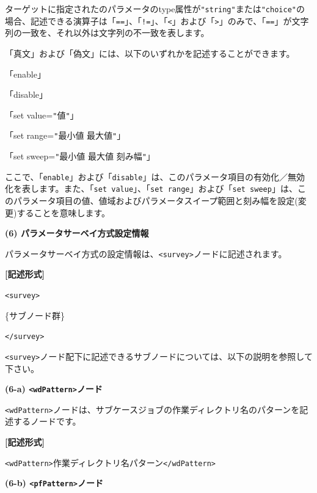 \documentclass[a4paper,11pt]{jarticle}
\begin{document}
{ターゲットに指定されたのパラメータのtype属性が\texttt{"string"}または\texttt{"choice"}の場合、記述できる演算子は「\texttt{==}」、「\texttt{!=}」、「\texttt{<}」および「\texttt{>}」のみで、「\texttt{==}」が文字列の一致を、それ以外は文字列の不一致を表します。

「真文」および「偽文」には、以下のいずれかを記述することができます。

\leftskip=10pt
\begin{tt}
「enable」

「disable」

「set value=\texttt{"}値\texttt{"}」

「set range=\texttt{"}最小値  最大値\texttt{"}」

「set sweep=\texttt{"}最小値  最大値  刻み幅\texttt{"}」
\end{tt}
\leftskip=0pt
ここで、「{\tt enable}」および「{\tt disable}」は、このパラメータ項目の有効化／無効化を表します。また、「{\tt set value}」、「{\tt set range}」および「{\tt set sweep}」は、このパラメータ項目の値、値域およびパラメータスイープ範囲と刻み幅を設定(変更)することを意味します。

\vspace{12pt}
\textbf{(6) パラメータサーベイ方式設定情報}

パラメータサーベイ方式の設定情報は、\texttt{<survey>}ノードに記述されます。

\vspace{8pt}
\leftskip=12pt
\textbf{[記述形式]}

\leftskip=42pt
\texttt{<survey>}    

\parindent=14pt
\{サブノード群\}

\parindent=0pt
\texttt{</survey>}

\vspace{8pt}
\leftskip=0pt
\texttt{<survey>}ノード配下に記述できるサブノードについては、以下の説明を参照して下さい。

\vspace{12pt}
\textbf{(6-a) \texttt{<wdPattern>}ノード}

\texttt{<wdPattern>}ノードは、サブケースジョブの作業ディレクトリ名のパターンを記述するノードです。

\vspace{8pt}
\leftskip=12pt
\textbf{[記述形式]}

\leftskip=42pt
\texttt{<wdPattern>}作業ディレクトリ名パターン\texttt{</wdPattern>}

\vspace{12pt}
\leftskip=0pt
\textbf{(6-b) \texttt{<pfPattern>}ノード}

}
\end{document}
